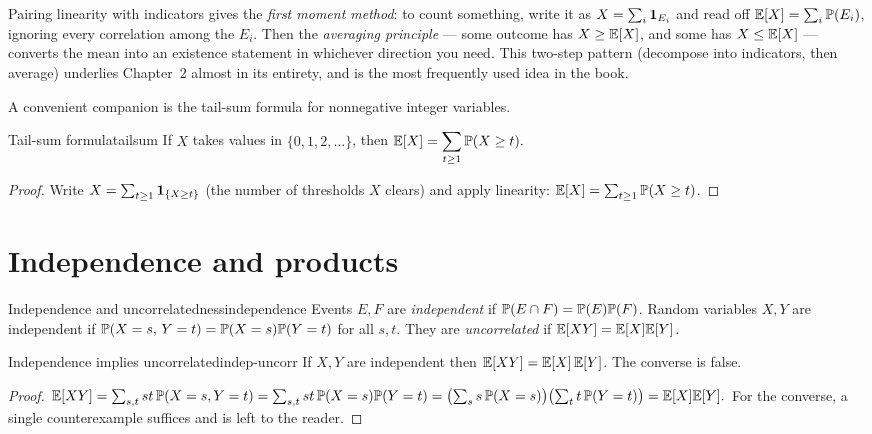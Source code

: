 \begin{insight}
Pairing linearity with indicators gives the \emph{first moment method}: to
count something, write it as $X=\sum_i\mathbf{1}_{E_i}$ and read off
$\mathbb{E}[X]=\sum_i\mathbb{P}(E_i)$, ignoring every correlation among the $E_i$. Then the
\emph{averaging principle} --- some outcome has $X\ge\mathbb{E}[X]$, and some has
$X\le\mathbb{E}[X]$ --- converts the mean into an existence statement in whichever
direction you need. This two-step pattern (decompose into indicators, then
average) underlies Chapter~2 almost in its entirety, and is the most
frequently used idea in the book.
\end{insight}

A convenient companion is the tail-sum formula for nonnegative integer
variables.

\begin{proposition}{Tail-sum formula}{tailsum}
If $X$ takes values in $\{0,1,2,\dots\}$, then
$\displaystyle \mathbb{E}[X]=\sum_{t\ge1}\mathbb{P}(X\ge t).$
\end{proposition}

\begin{proof}
Write $X=\sum_{t\ge1}\mathbf{1}_{\{X\ge t\}}$ (the number of thresholds $X$ clears)
and apply linearity: $\mathbb{E}[X]=\sum_{t\ge1}\mathbb{P}(X\ge t)$.
\end{proof}

\section{Independence and products}

\begin{definition}{Independence and uncorrelatedness}{independence}
Events $E,F$ are \emph{independent} if $\mathbb{P}(E\cap F)=\mathbb{P}(E)\mathbb{P}(F)$.
Random variables $X,Y$ are independent if $\mathbb{P}(X=s,\,Y=t)=\mathbb{P}(X=s)\mathbb{P}(Y=t)$
for all $s,t$. They are \emph{uncorrelated} if $\mathbb{E}[XY]=\mathbb{E}[X]\mathbb{E}[Y]$.
\end{definition}

\begin{proposition}{Independence implies uncorrelated}{indep-uncorr}
If $X,Y$ are independent then $\mathbb{E}[XY]=\mathbb{E}[X]\,\mathbb{E}[Y]$. The converse is false.
\end{proposition}

\begin{proof}
$\mathbb{E}[XY]=\sum_{s,t}st\,\mathbb{P}(X=s,Y=t)=\sum_{s,t}st\,\mathbb{P}(X=s)\mathbb{P}(Y=t)
=\bigl(\sum_s s\,\mathbb{P}(X=s)\bigr)\bigl(\sum_t t\,\mathbb{P}(Y=t)\bigr)=\mathbb{E}[X]\mathbb{E}[Y].$
For the converse, a single counterexample suffices and is left to the reader.
\end{proof}

